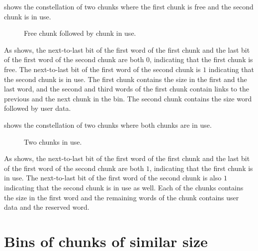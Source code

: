  shows the constellation of two chunks where the
first chunk is free and the second chunk is in use.

\begin{figure}
\begin{center}
\end{center}
\caption{\label{fig-chunks3}
Free chunk followed by chunk in use.}
\end{figure}

As  shows, the next-to-last bit of the first word
of the first chunk and the last bit of the first word of the second
chunk are both $0$, indicating that the first chunk is free.  The
next-to-last bit of the first word of the second chunk is $1$
indicating that the second chunk is in use.  The first chunk contains
the size in the first and the last word, and the second and third
words of the first chunk contain links to the previous and the next
chunk in the bin.  The second chunk contains the size word followed by
user data.

 shows the constellation of two chunks where both
chunks are in use.

\begin{figure}
\begin{center}
\end{center}
\caption{\label{fig-chunks4}
Two chunks in use.}
\end{figure}

As  shows, the next-to-last bit of the first word
of the first chunk and the last bit of the first word of the second
chunk are both $1$, indicating that the first chunk is in use.  The
next-to-last bit of the first word of the second chunk is also $1$
indicating that the second chunk is in use as well.  Each of the
chunks contains the size in the first word and the remaining words of
the chunk contains user data and the reserved word.

\section{Bins of chunks of similar size}
\label{sec-memory-allocator-bins-of-chunks}

